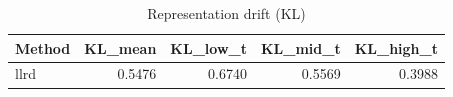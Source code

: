 \begin{table}[htbp]
\centering
\caption{Representation drift (KL)}
\label{tab:repr-drift}
\begin{tabular}{lrrrr}
\toprule
\textbf{Method} & \textbf{KL\_mean} & \textbf{KL\_low\_t} & \textbf{KL\_mid\_t} & \textbf{KL\_high\_t} \\
\midrule
llrd & 0.5476 & 0.6740 & 0.5569 & 0.3988 \\
\bottomrule
\end{tabular}
\end{table}
